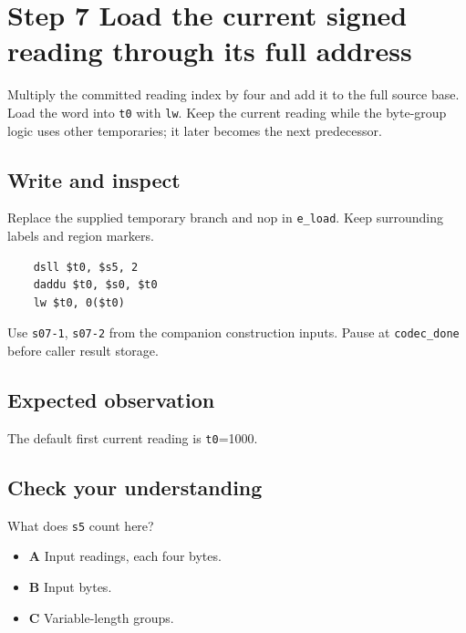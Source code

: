 \section{Step 7 Load the current signed reading through its full address}\label{delta-s07}

Multiply the committed reading index by four and add it to the full source base. Load the word into \texttt{t0} with \texttt{lw}. Keep the current reading while the byte-group logic uses other temporaries; it later becomes the next predecessor.

\subsection{Write and inspect}
Replace the supplied temporary branch and nop in \texttt{e\_load}. Keep surrounding labels and region markers.

\begin{verbatim}
    dsll $t0, $s5, 2
    daddu $t0, $s0, $t0
    lw $t0, 0($t0)
\end{verbatim}
Use \texttt{s07-1}, \texttt{s07-2} from the companion construction inputs. Pause at \texttt{codec\_done} before caller result storage.

\subsection{Expected observation}
The default first current reading is \texttt{t0}=1000.

\subsection{Check your understanding}
What does \texttt{s5} count here?

\begin{itemize}
\item \textbf{A} Input readings, each four bytes.
\item \textbf{B} Input bytes.
\item \textbf{C} Variable-length groups.
\end{itemize}

